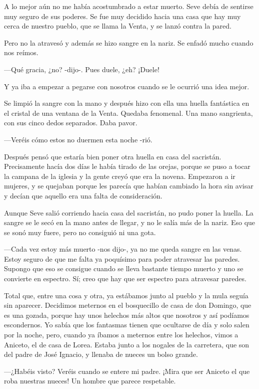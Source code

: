 \documentclass{barcodevapor3pags}
\begin{document}
A lo mejor aún no me había acostumbrado a estar muerto. Seve debía de
sentirse muy seguro de sus poderes. Se fue muy decidido hacia una casa
que hay muy cerca de nuestro pueblo, que se llama la Venta, y se lanzó
contra la pared.~

Pero no la atravesó y además se hizo sangre en la nariz. Se enfadó mucho
cuando nos reímos.~

---Qué gracia, ¿no? -dijo-. Pues duele, ¿eh? ¡Duele!~

Y ya iba a empezar a pegarse con nosotros cuando se le ocurrió una idea
mejor.~

Se limpió la sangre con la mano y después hizo con ella una huella
fantástica en el cristal de una ventana de la Venta. Quedaba fenomenal.
Una mano sangrienta, con sus cinco dedos separados. Daba pavor.~

---Veréis cómo estos no duermen esta noche -rió.~

Después pensó que estaría bien poner otra huella en casa del sacristán.
Precisamente hacía dos días le había tirado de las orejas, porque se
puso a tocar la campana de la iglesia y la gente creyó que era la
novena. Empezaron a ir mujeres, y se quejaban porque les parecía que
habían cambiado la hora sin avisar y decían que aquello era una falta de
consideración.~

Aunque Seve salió corriendo hacia casa del sacristán, no pudo poner la
huella. La sangre se le secó en la mano antes de llegar, y no le salía
más de la nariz. Eso que se sonó muy fuere, pero no consiguió ni una
gota.~

---Cada vez estoy más muerto -nos dijo-, ya no me queda sangre en las
venas. Estoy seguro de que me falta ya poquísimo para poder atravesar
las paredes. Supongo que eso se consigue cuando se lleva bastante tiempo
muerto y uno se convierte en espectro. Sí; creo que hay que ser espectro
para atravesar paredes.

Total que, entre una cosa y otra, ya estábamos junto al pueblo y la mula
seguía sin aparecer. Decidimos meternos en el bosquecillo de casa de don
Domingo, que es una gozada, porque hay unos helechos más altos que
nosotros y así podíamos escondernos. Yo sabía que los fantasmas tienen
que ocultarse de día y solo salen por la noche, pero, cuando ya íbamos a
meternos entre los helechos, vimos a Aniceto, el de casa de Lorea.
Estaba junto a los nogales de la carretera, que son del padre de José
Ignacio, y llenaba de nueces un bolso grande.~

---¿Habéis visto? Veréis cuando se entere mi padre. ¡Mira que ser
Aniceto el que roba nuestras nueces! Un hombre que parece respetable.~
\end{document}

